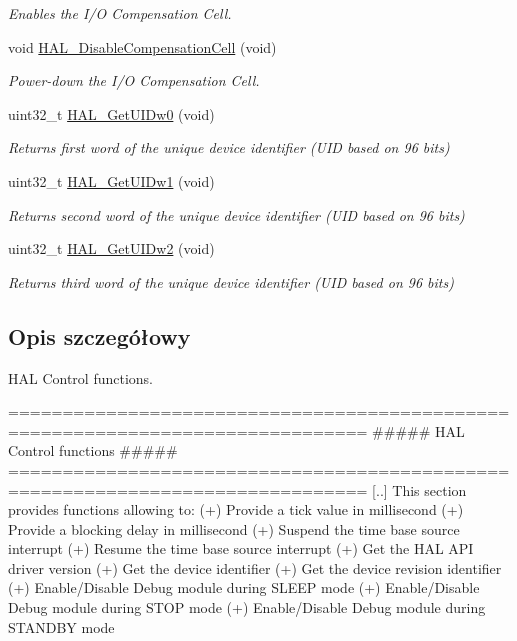 \begin{DoxyCompactItemize}
\begin{DoxyCompactList}\small\item\em Enables the I/O Compensation Cell. \end{DoxyCompactList}\item 
void \hyperlink{group___h_a_l___exported___functions___group2_ga653f1166b0e37afd40372550d806e667}{H\+A\+L\+\_\+\+Disable\+Compensation\+Cell} (void)
\begin{DoxyCompactList}\small\item\em Power-\/down the I/O Compensation Cell. \end{DoxyCompactList}\item 
uint32\+\_\+t \hyperlink{group___h_a_l___exported___functions___group2_gaf982aa0a575eef3758c0840a24077506}{H\+A\+L\+\_\+\+Get\+U\+I\+Dw0} (void)
\begin{DoxyCompactList}\small\item\em Returns first word of the unique device identifier (U\+ID based on 96 bits) \end{DoxyCompactList}\item 
uint32\+\_\+t \hyperlink{group___h_a_l___exported___functions___group2_ga52720dd92ed2bd4314a2a129855d766c}{H\+A\+L\+\_\+\+Get\+U\+I\+Dw1} (void)
\begin{DoxyCompactList}\small\item\em Returns second word of the unique device identifier (U\+ID based on 96 bits) \end{DoxyCompactList}\item 
uint32\+\_\+t \hyperlink{group___h_a_l___exported___functions___group2_ga5785ae5ec8d4c5a7dadb1359f0778700}{H\+A\+L\+\_\+\+Get\+U\+I\+Dw2} (void)
\begin{DoxyCompactList}\small\item\em Returns third word of the unique device identifier (U\+ID based on 96 bits) \end{DoxyCompactList}\end{DoxyCompactItemize}


\subsection{Opis szczegółowy}
H\+AL Control functions. 

\begin{DoxyVerb} ===============================================================================
                      ##### HAL Control functions #####
 ===============================================================================
    [..]  This section provides functions allowing to:
      (+) Provide a tick value in millisecond
      (+) Provide a blocking delay in millisecond
      (+) Suspend the time base source interrupt
      (+) Resume the time base source interrupt
      (+) Get the HAL API driver version
      (+) Get the device identifier
      (+) Get the device revision identifier
      (+) Enable/Disable Debug module during SLEEP mode
      (+) Enable/Disable Debug module during STOP mode
      (+) Enable/Disable Debug module during STANDBY mode\end{DoxyVerb}
 

